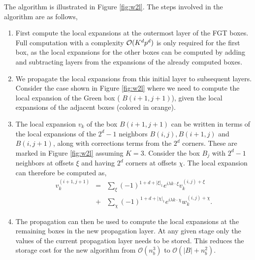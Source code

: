 The algorithm is illustrated in Figure \ref{fig:w2l}. The steps involved in the
algorithm are as follows, 
\begin{enumerate}    
  \item First compute the local expansions at the outermost layer of the FGT
    boxes. Full computation with a complexity $\mathcal{O}(K^d p^d)$ is only required for the first box, as
    the local expansions for the other boxes can be computed by adding and
    subtracting layers from the expansions of the already computed boxes. 
  
  \item We propagate the local expansions from this initial layer to subsequent
    layers. Consider the case shown in Figure \ref{fig:w2l} where we need to
    compute the local expansion of the Green box ( $B(i+1,j+1)$), given the
    local expansions of the adjacent boxes (colored in orange).  
  
  \item The local expansion $v_k$ of the box $B(i+1, j+1)$ can be written in terms of the
    local expansions of the $2^d -1$ neighbors $B(i,j), B(i+1,j)$ and
    $B(i,j+1)$, along with corrections terms from the $2^d$ corners.
    These are marked in Figure \ref{fig:w2l} assuming $K=3$. Consider the box $B_j$ with $2^d -1$ neighbors at offsets $\xi$ and having $2^d$ corners at offsets $\chi$. The local expansion can therefore be computed as,
    \begin{eqnarray} 
    v_k^{(i+1,j+1)} &=& \sum_{\xi} (-1)^{1 + d + |\xi|_1} e^{i\lambda k\cdot\xi} v_k^{(i,j)+\xi} \nonumber\\
    & +& \sum_{\chi} (-1)^{1 + d + |\chi|_1} e^{i\lambda k\cdot \chi} w_k^{(i,j)+\chi}. \label{eqn:sweep}
    \end{eqnarray}
    
  
  \item The propagation can then be used to compute the local expansions at the remaining boxes in
    the new propagation layer. At any given stage only the values of the current 
    propagation layer needs to be stored. This reduces the storage cost for the new algorithm from
    $\mathcal{O}(n_b^3)$ to $\mathcal{O}(|B| + n_b^2)$.

\end{enumerate}


